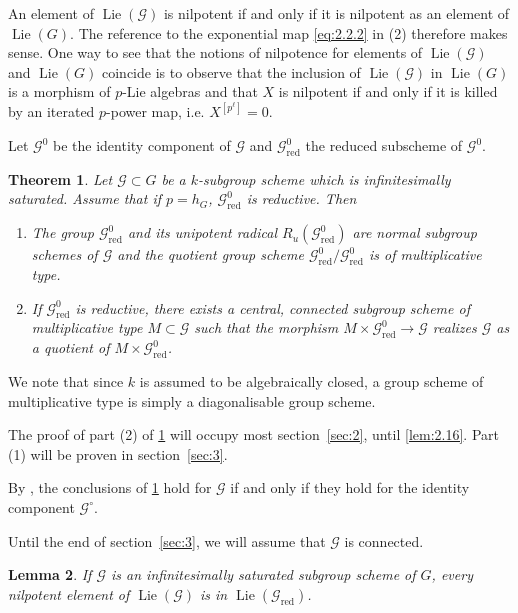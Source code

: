 \documentclass[11pt,a4paper]{article}
\theoremstyle{plain}
\newtheorem{theorem}{Theorem}[section]
\newtheorem{lemma}[theorem]{Lemma}
\theoremstyle{definition}
\DeclareMathOperator{\Lie}{Lie}
\newcommand{\red}{\mathrm{red}}
\begin{document}
An element of $\Lie(\mathcal{G})$ is nilpotent if and only if it is nilpotent as an element of $\Lie(G)$. The reference to the exponential map \eqref{eq:2.2.2} in (2) therefore makes sense. One way to see that the notions of nilpotence for elements of $\Lie(\mathcal{G})$ and $\Lie(G)$ coincide is to observe that the inclusion of $\Lie(\mathcal{G})$ in $\Lie(G)$ is a morphism of $p$-Lie algebras and that $X$ is nilpotent if and only if it is killed by an iterated $p$-power map, i.e. $X^{[p^\ell]} = 0$.

Let $\mathcal{G}^0$ be the identity component of $\mathcal{G}$ and $\mathcal{G}^0_\red$ the reduced subscheme of $\mathcal{G}^0$.

\begin{theorem} \label{thm:2.5}
Let $\mathcal{G} \subset G$ be a $k$-subgroup scheme which is infinitesimally saturated. Assume that if $p = h_G$, $\mathcal{G}^0_\red$ is reductive. Then
\begin{enumerate}
\item The group $\mathcal{G}^0_\red$ and its unipotent radical $R_u(\mathcal{G}^0_\red)$ are normal subgroup schemes of $\mathcal{G}$ and the quotient group scheme $\mathcal{G}^0_\red/\mathcal{G}^0_\red$ is of multiplicative type.
\item If $\mathcal{G}^0_\red$ is reductive, there exists a central, connected subgroup scheme of multiplicative type $M \subset \mathcal{G}$ such that the morphism $M \times \mathcal{G}^0_\red \to \mathcal{G}$ realizes $\mathcal{G}$ as a quotient of $M \times \mathcal{G}^0_\red$.
\end{enumerate}
\end{theorem}

We note that since $k$ is assumed to be algebraically closed, a group scheme of multiplicative type is simply a diagonalisable group scheme.

The proof of part (2) of \ref{thm:2.5} will occupy most section~\ref{sec:2}, until \ref{lem:2.16}. Part (1) will be proven in section~\ref{sec:3}.

By \cite[Lemma~2.3]{D}, the conclusions of \ref{thm:2.5} hold for $\mathcal{G}$ if and only if they hold for the identity component $\mathcal{G}^\circ$.

Until the end of section~\ref{sec:3}, we will assume that $\mathcal{G}$ is connected.

\begin{lemma} \label{lem:2.6}
If $\mathcal{G}$ is an infinitesimally saturated subgroup scheme of $G$, every nilpotent element of $\Lie(\mathcal{G})$ is in $\Lie(\mathcal{G}_\red)$.
\end{lemma}
\end{document}

